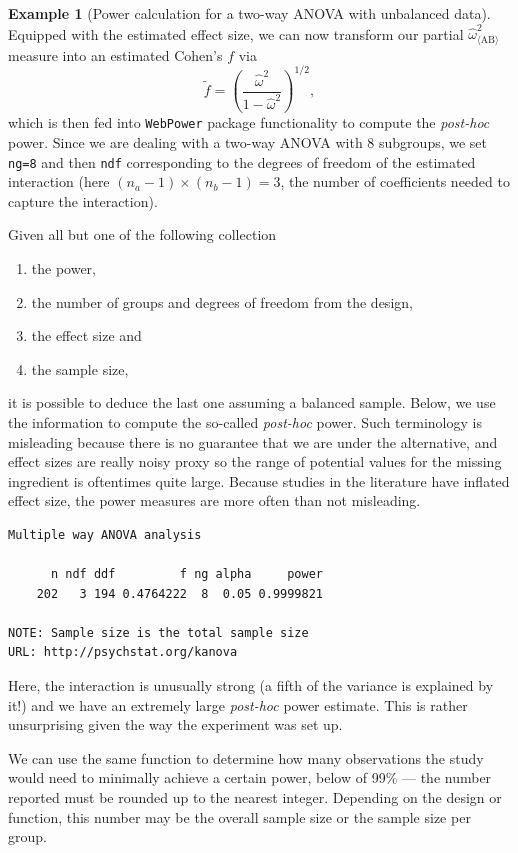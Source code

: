 \documentclass[
  11pt,
  letterpaper,
]{scrbook}
\providecommand{\tightlist}{%
  \setlength{\itemsep}{0pt}\setlength{\parskip}{0pt}}\usepackage{longtable,booktabs,array}
\theoremstyle{definition}
\newtheorem{example}{Example}[chapter]
\theoremstyle{definition}
\theoremstyle{remark}
\begin{document}
\begin{example}[Power calculation for a two-way ANOVA with unbalanced
data]
Equipped with the estimated effect size, we can now transform our
partial \(\widehat{\omega}^2_{\langle\text{AB}\rangle}\) measure into an
estimated Cohen's \(f\) via
\[\widetilde{f} = \left( \frac{\widehat{\omega}^2}{1-\widehat{\omega}^2}\right)^{1/2},\]
which is then fed into \texttt{WebPower} package functionality to
compute the \emph{post-hoc} power. Since we are dealing with a two-way
ANOVA with 8 subgroups, we set \texttt{ng=8} and then \texttt{ndf}
corresponding to the degrees of freedom of the estimated interaction
(here \((n_a-1)\times (n_b-1)=3\), the number of coefficients needed to
capture the interaction).

Given all but one of the following collection

\begin{enumerate}
\def\labelenumi{\arabic{enumi}.}
\tightlist
\item
  the power,
\item
  the number of groups and degrees of freedom from the design,
\item
  the effect size and
\item
  the sample size,
\end{enumerate}

it is possible to deduce the last one assuming a balanced sample. Below,
we use the information to compute the so-called \emph{post-hoc} power.
Such terminology is misleading because there is no guarantee that we are
under the alternative, and effect sizes are really noisy proxy so the
range of potential values for the missing ingredient is oftentimes quite
large. Because studies in the literature have inflated effect size, the
power measures are more often than not misleading.

\begin{verbatim}
Multiple way ANOVA analysis

      n ndf ddf         f ng alpha     power
    202   3 194 0.4764222  8  0.05 0.9999821

NOTE: Sample size is the total sample size
URL: http://psychstat.org/kanova
\end{verbatim}

Here, the interaction is unusually strong (a fifth of the variance is
explained by it!) and we have an extremely large \emph{post-hoc} power
estimate. This is rather unsurprising given the way the experiment was
set up.

We can use the same function to determine how many observations the
study would need to minimally achieve a certain power, below of 99\% ---
the number reported must be rounded up to the nearest integer. Depending
on the design or function, this number may be the overall sample size or
the sample size per group.


\end{example}
\end{document}

